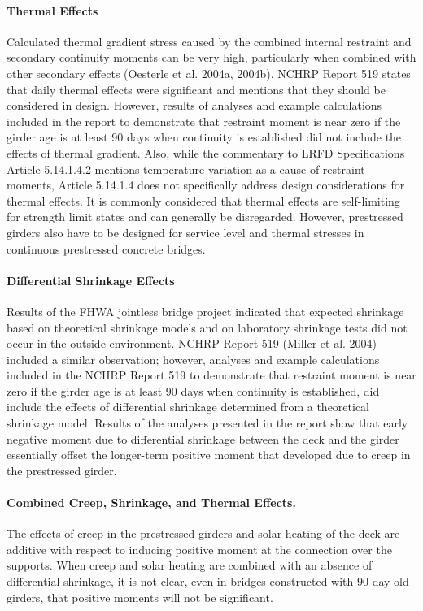\paragraph*{Thermal Effects}
Calculated thermal gradient stress caused by the combined internal restraint and secondary continuity moments can be very high, particularly when combined with other secondary effects (Oesterle et al. 2004a, 2004b). NCHRP Report 519 states that daily thermal effects were significant and mentions that they should be considered in design. However, results of analyses and example calculations included in the report to demonstrate that restraint moment is near zero if the girder age is at least 90 days when continuity is established did not include the effects of thermal gradient. Also, while the commentary to LRFD Specifications Article 5.14.1.4.2 mentions temperature variation as a cause of restraint moments, Article 5.14.1.4 does not specifically address design considerations for thermal effects. It is commonly considered that thermal effects are self-limiting for strength limit states and can generally be disregarded. However, prestressed girders also have to be designed for service level and thermal stresses in continuous prestressed concrete bridges.

\paragraph*{Differential Shrinkage Effects}
Results of the FHWA jointless bridge project indicated that expected shrinkage
based on theoretical shrinkage models and on laboratory shrinkage tests did not occur in the outside environment. NCHRP Report 519 (Miller et al. 2004) included a similar observation; however, analyses and example calculations included in the NCHRP Report 519 to demonstrate that restraint moment is near zero if the girder age is at least 90 days when continuity is established, did include the effects of differential shrinkage determined from a theoretical shrinkage model. Results of the analyses presented in the report show that early negative moment due to differential shrinkage between the deck and the girder essentially offset the longer-term positive moment that developed due to creep in the prestressed girder.

\paragraph*{Combined Creep, Shrinkage, and Thermal Effects.}
The effects of creep in the prestressed girders and solar heating of the deck are additive with respect to inducing positive moment at the connection over the supports. When creep and solar heating are combined with an absence of differential shrinkage, it is not clear, even in bridges constructed with 90 day old girders, that positive moments will not be significant.


